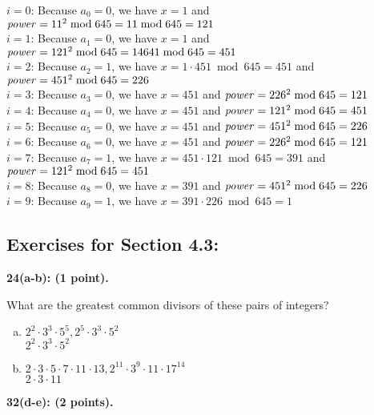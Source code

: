 \documentclass[12pt]{article}  %
\begin{document}
\noindent
$i=0$: Because $a_0=0$, we have $x=1$ and $\textrm{\textit{power}}=11^2\bmod{645}=11\bmod{645}=121$\\
$i=1$: Because $a_1=0$, we have $x=1$ and $\textrm{\textit{power}}=121^2\bmod{645}=14641\bmod{645}=451$\\
$i=2$: Because $a_2=1$, we have $x=1\cdot451\bmod{645}=451$ and $\textrm{\textit{power}}=451^2\bmod{645}=226$\\
$i=3$: Because $a_3=0$, we have $x=451$ and $\textrm{\textit{power}}=226^2\bmod{645}=121$\\
$i=4$: Because $a_4=0$, we have $x=451$ and $\textrm{\textit{power}}=121^2\bmod{645}=451$\\
$i=5$: Because $a_5=0$, we have $x=451$ and $\textrm{\textit{power}}=451^2\bmod{645}=226$\\
$i=6$: Because $a_6=0$, we have $x=451$ and $\textrm{\textit{power}}=226^2\bmod{645}=121$\\
$i=7$: Because $a_7=1$, we have $x=451\cdot121\bmod{645}=391$ and $\textrm{\textit{power}}=121^2\bmod{645}=451$\\
$i=8$: Because $a_8=0$, we have $x=391$ and $\textrm{\textit{power}}=451^2\bmod{645}=226$\\
$i=9$: Because $a_9=1$, we have $x=391\cdot226\bmod{645}=1$

\clearpage
\subsection*{Exercises for Section 4.3:}     

\noindent
{\bf 24(a-b): (1 point).}

\noindent
What are the greatest common divisors of these pairs of integers?
\begin{enumerate}[a)]
    \item $2^2\cdot3^3\cdot5^5,2^5\cdot3^3\cdot5^2$\\
    $2^2\cdot3^3\cdot5^2$
    \item $2\cdot3\cdot5\cdot7\cdot11\cdot13,2^{11}\cdot3^9\cdot11\cdot17^{14}$\\
    $2\cdot3\cdot11$
\end{enumerate}


\noindent
{\bf 32(d-e): (2 points).}
\end{document}
